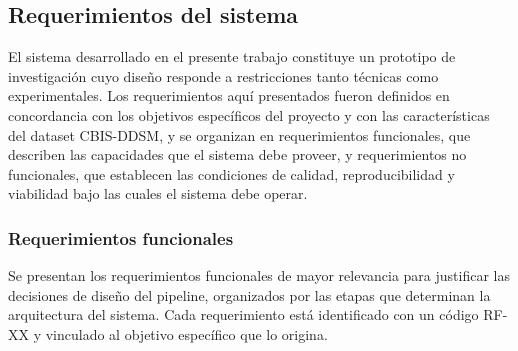 
\subsection{Requerimientos del sistema}

El sistema desarrollado en el presente trabajo constituye un prototipo de 
investigación cuyo diseño responde a restricciones tanto técnicas como 
experimentales. Los requerimientos aquí presentados fueron definidos en 
concordancia con los objetivos específicos del proyecto y con las 
características del dataset CBIS-DDSM, y se organizan en requerimientos 
funcionales, que describen las capacidades que el sistema debe proveer,
y requerimientos no funcionales, que establecen las condiciones de calidad, 
reproducibilidad y viabilidad bajo las cuales el sistema debe operar.

\subsubsection{Requerimientos funcionales}

Se presentan los requerimientos funcionales de mayor relevancia
para justificar las decisiones de diseño del pipeline,
organizados por las etapas que determinan la arquitectura
del sistema. Cada requerimiento está identificado con un
código RF-XX y vinculado al objetivo específico que lo origina.


